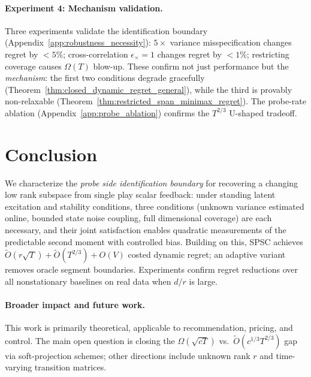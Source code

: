 \documentclass{article}
\begin{document}
  \paragraph{Experiment 4: Mechanism validation.}
  Three experiments validate the identification boundary (Appendix~\ref{app:robustness_necessity}): $5\times$ variance
  misspecification changes regret by $<5\%$; cross-correlation $\epsilon_\times{=}1$ changes regret by $<1\%$; restricting coverage
  causes $\Omega(T)$ blow-up. These confirm not just performance but the \emph{mechanism}: the first two conditions degrade
  gracefully (Theorem~\ref{thm:closed_dynamic_regret_general}), while the third is provably non-relaxable
  (Theorem~\ref{thm:restricted_span_minimax_regret}). The probe-rate ablation (Appendix~\ref{app:probe_ablation}) confirms the
  $T^{2/3}$ U-shaped tradeoff.




\vspace{-2pt}
\section{Conclusion}
\label{sec:conclusion}

We characterize the \emph{probe side identification boundary} for recovering a changing low rank subspace from single play
   scalar feedback: under standing latent excitation and stability conditions, three conditions (unknown variance estimated
  online, bounded state noise coupling, full dimensional coverage) are each necessary, and their joint satisfaction enables
  quadratic measurements of the predictable second moment with controlled bias.
Building on this, SPSC achieves $\widetilde{O}(r\sqrt{T}) + \widetilde{O}(T^{2/3}) + O(V)$ costed dynamic regret; an adaptive variant removes oracle segment boundaries.
Experiments confirm regret reductions over all nonstationary baselines on real data when $d/r$ is large.




\paragraph{Broader impact and future work.}
This work is primarily theoretical, applicable to recommendation, pricing, and control. The main open question is closing the $\Omega(\sqrt{cT})$ vs.\ $\widetilde{O}(c^{1/3}T^{2/3})$ gap via soft-projection schemes; other directions include unknown rank $r$ and time-varying transition matrices.

\newpage


\end{document}
